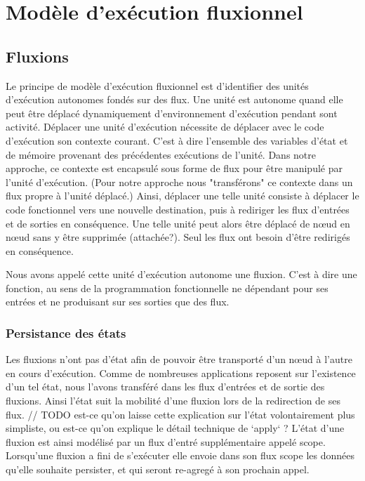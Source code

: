 \section{Modèle d'exécution fluxionnel}

	\subsection{Fluxions}

		Le principe de modèle d'exécution fluxionnel est d'identifier des unités d'exécution autonomes fondés sur des flux.
		Une unité est autonome quand elle peut être déplacé dynamiquement d'environnement d'exécution pendant sont activité.
		Déplacer une unité d'exécution nécessite de déplacer avec le code d'exécution son contexte courant. C'est à dire l'ensemble des variables d'état et de mémoire provenant des précédentes exécutions de l'unité.
		Dans notre approche, ce contexte est encapsulé sous forme de flux pour être manipulé par l'unité d'exécution.
		(Pour notre approche nous "transférons" ce contexte dans un flux propre à l'unité déplacé.)
		Ainsi, déplacer une telle unité consiste à déplacer le code fonctionnel vers une nouvelle destination, puis à rediriger les flux d'entrées et de sorties en conséquence. Une telle unité peut alors être déplacé de nœud en nœud sans y être supprimée (attachée?).
		Seul les flux ont besoin d'être redirigés en conséquence.

		Nous avons appelé cette unité d'exécution autonome une fluxion. C'est à dire une fonction, au sens de la programmation fonctionnelle ne dépendant pour ses entrées et ne produisant sur ses sorties que des flux.

		\subsubsection{Persistance des états}

			Les fluxions n'ont pas d'état afin de pouvoir être transporté d'un nœud à l'autre en cours d'exécution. Comme de nombreuses applications reposent sur l'existence d'un tel état, nous l'avons transféré dans les flux d'entrées et de sortie des fluxions. Ainsi l'état suit la mobilité d'une fluxion lors de la redirection de ses flux.
			// TODO est-ce qu'on laisse cette explication sur l'état volontairement plus simpliste, ou est-ce qu'on explique le détail technique de `apply` ?
			L'état d'une fluxion est ainsi modélisé par un flux d'entré supplémentaire appelé scope. Lorsqu'une fluxion a fini de s'exécuter elle envoie dans son flux scope les données qu'elle souhaite persister, et qui seront re-agregé à son prochain appel.

